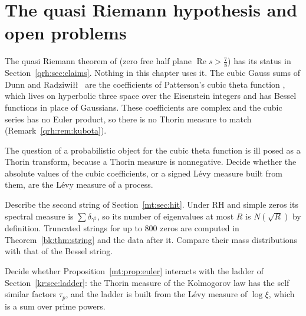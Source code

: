 \section{The quasi Riemann hypothesis and open problems}\label{mt:sec:open}
The quasi Riemann theorem of \cite{OAI26a} (zero free half plane $\operatorname{Re}s>\frac78$) has its status in Section~\ref{qrh:sec:claims}. Nothing in this chapter uses it. The cubic Gauss sums of Dunn and Radziwi\l\l\ \cite{NCDunnRadziwill24} are the coefficients of Patterson's cubic theta function \cite{NCPatterson77}, which lives on hyperbolic three space over the Eisenstein integers and has Bessel functions in place of Gaussians. These coefficients are complex and the cubic series has no Euler product, so there is no Thorin measure to match (Remark~\ref{qrh:rem:kubota}).
\begin{problem}\label{mt:prob:cubic}
The question of a probabilistic object for the cubic theta function is ill posed as a Thorin transform, because a Thorin measure is nonnegative. Decide whether the absolute values of the cubic coefficients, or a signed L\'evy measure built from them, are the L\'evy measure of a process.
\end{problem}
\begin{problem}\label{mt:prob:string}
Describe the second string of Section~\ref{mt:sec:hit}. Under RH and simple zeros its spectral measure is $\sum\delta_{\gamma^2}$, so its number of eigenvalues at most $R$ is $N(\sqrt R)$ by definition. Truncated strings for up to $800$ zeros are computed in Theorem~\ref{bk:thm:string} and the data after it. Compare their mass distributions with that of the Bessel string.
\end{problem}
\begin{problem}\label{mt:prob:ladder}
Decide whether Proposition~\ref{mt:prop:euler} interacts with the ladder of Section~\ref{kr:sec:ladder}: the Thorin measure of the Kolmogorov law has the self similar factors $\tau_p$, and the ladder is built from the L\'evy measure of $\log\xi$, which is a sum over prime powers.
\end{problem}
